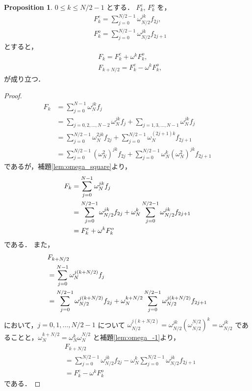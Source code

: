 \documentclass[twocolumn, uplatex, dvipdfmx]{jsarticle}
\renewcommand{\le}{\leqslant}
\numberwithin{equation}{section}
\theoremstyle{definition}
\newtheorem{prop}{Proposition}[section]
\begin{document}
\begin{prop}\label{prop:eo}
	$0\le k\le N/2-1$ とする．
	$F_k^e$, $F_k^o$ を，
	\begin{align}
		&F_k^e=\sum_{j=0}^{N/2-1}\omega_{N/2}^{jk}f_{2j},\\
		&F_k^o=\sum_{j=0}^{N/2-1}\omega_{N/2}^{jk}f_{2j+1}
	\end{align}
	とすると，
	\begin{align}
		&F_k=F_k^e+\omega^kF_k^o,\\
		&F_{k+N/2}=F_k^e-\omega^kF_k^o,
	\end{align}
	が成り立つ．
\end{prop}
\begin{proof}
	\begin{align*}
		F_k&=\sum_{j=0}^{N-1}\omega_N^{jk}f_j\\
		&=\sum_{j=0,2,\dots,N-2}\omega_N^{jk}f_j+\sum_{j=1,3,\dots,N-1}\omega_N^{jk}f_j\\
		&=\sum_{j=0}^{N/2-1}\omega_N^{2jk}f_{2j}+\sum_{j=0}^{N/2-1}\omega_N^{(2j+1)k}f_{2j+1}\\
		&=\sum_{j=0}^{N/2-1}(\omega_N^2)^{jk}f_{2j}+\sum_{j=0}^{N/2-1}\omega_N^k(\omega_N^2)^{jk}f_{2j+1}
	\end{align*}
	であるが，補題\ref{lem:omega_square}より，
	\begin{align*}
		F_k&=\sum_{j=0}^{N-1}\omega_N^{jk}f_j\notag\\
		&=\sum_{j=0}^{N/2-1}\omega_{N/2}^{jk}f_{2j}+\omega_N^k\sum_{j=0}^{N/2-1}\omega_{N/2}^{jk}f_{2j+1}\\
		&=F_k^e+\omega^kF_k^o
	\end{align*}
	である．
	また，
	\begin{align*}
		&F_{k+N/2}\\
		&=\sum_{j=0}^{N-1}\omega_N^{j(k+N/2)}f_j\notag\\
		&=\sum_{j=0}^{N/2-1}\omega_{N/2}^{j(k+N/2)}f_{2j}+\omega_N^{k+N/2}\sum_{j=0}^{N/2-1}\omega_{N/2}^{j(k+N/2)}f_{2j+1}
	\end{align*}
	において，$j=0,1,\dots,N/2-1$ について $\omega_{N/2}^{j(k+N/2)}=\omega_{N/2}^{jk}(\omega_{N/2}^{N/2})^k=\omega_{N/2}^{jk}$ であることと，$\omega_N^{k+N/2}=\omega_N^k\omega_N^{N/2}$ と補題\ref{lem:omega_-1}より，
	\begin{align*}
		&F_{k+N/2}\\
		&=\sum_{j=0}^{N/2-1}\omega_{N/2}^{jk}f_{2j}-\omega_N^k\sum_{j=0}^{N/2-1}\omega_{N/2}^{jk}f_{2j+1}\\
		&=F_k^e-\omega^kF_k^o
	\end{align*}
	である．
\end{proof}
\end{document}
